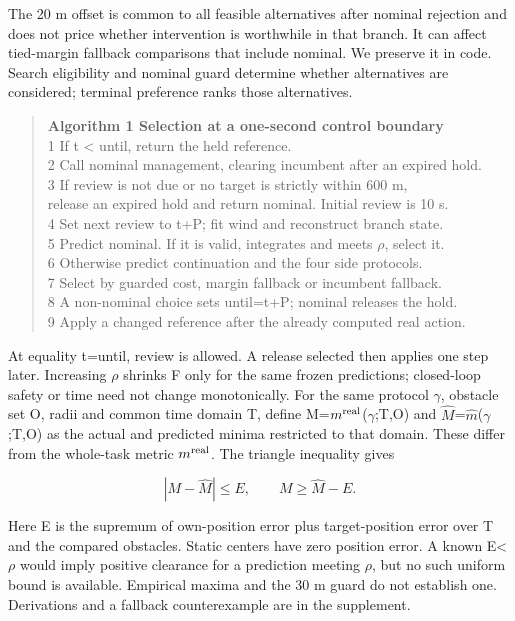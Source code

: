 \documentclass[conference]{IEEEtran}
\begin{document}
The 20 m offset is common to all feasible alternatives after nominal rejection and does not price whether intervention is worthwhile in that branch. It can affect tied-margin fallback comparisons that include nominal. We preserve it in code. Search eligibility and nominal guard determine whether alternatives are considered; terminal preference ranks those alternatives.

\begin{quote}\noindent\textbf{Algorithm 1  Selection at a one-second control boundary}\\[2pt]


1  If t < until, return the held reference. \\
2  Call nominal management, clearing incumbent after an expired hold. \\
3  If review is not due or no target is strictly within 600 m, \\
   release an expired hold and return nominal. Initial review is 10 s. \\
4  Set next review to t+P; fit wind and reconstruct branch state. \\
5  Predict nominal. If it is valid, integrates and meets \ensuremath{\rho}, select it. \\
6  Otherwise predict continuation and the four side protocols. \\
7  Select by guarded cost, margin fallback or incumbent fallback. \\
8  A non-nominal choice sets until=t+P; nominal releases the hold. \\
9  Apply a changed reference after the already computed real action.
\end{quote}

At equality t=until, review is allowed. A release selected then applies one step later. Increasing \ensuremath{\rho} shrinks F only for the same frozen predictions; closed-loop safety or time need not change monotonically. For the same protocol \ensuremath{\gamma}, obstacle set O, radii and common time domain T, define M=$m^{\rm real}$(\ensuremath{\gamma};T,O) and $\widehat M$=$\hat m$(\ensuremath{\gamma};T,O) as the actual and predicted minima restricted to that domain. These differ from the whole-task metric $m^{\rm real}$. The triangle inequality gives

\begin{equation}\label{eq:5}
|M-\widehat M|\le E,\qquad M\ge\widehat M-E.
\end{equation}

Here E is the supremum of own-position error plus target-position error over T and the compared obstacles. Static centers have zero position error. A known E<\ensuremath{\rho} would imply positive clearance for a prediction meeting \ensuremath{\rho}, but no such uniform bound is available. Empirical maxima and the 30 m guard do not establish one. Derivations and a fallback counterexample are in the supplement.
\end{document}
